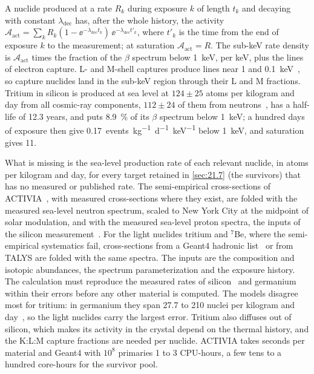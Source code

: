 A nuclide produced at a rate $R_k$ during exposure $k$ of length $t_k$ and decaying with constant $\lambda_{\mathrm{dec}}$ has, after the whole history, the activity $\mathcal{A}_{\mathrm{act}} = \sum_kR_k(1 - \ee^{-\lambda_{\mathrm{dec}}t_k})\,\ee^{-\lambda_{\mathrm{dec}}t'_k}$, where $t'_k$ is the time from the end of exposure $k$ to the measurement; at saturation $\mathcal{A}_{\mathrm{act}} = R$. The sub-keV rate density is $\mathcal{A}_{\mathrm{act}}$ times the fraction of the $\beta$ spectrum below \SI{1}{keV}, per keV, plus the lines of electron capture. L- and M-shell captures produce lines near 1 and \SI{0.1}{keV}~\cite[Sect.~1]{armengaud2017measurement}, so capture nuclides land in the sub-keV region through their L and M fractions. Tritium in silicon is produced at sea level at $124 \pm 25$ atoms per kilogram and day from all cosmic-ray components, $112 \pm 24$ of them from neutrons~\cite{saldanha2020cosmogenic}, has a half-life of 12.3 years, and puts \SI{8.9}{\percent} of its $\beta$ spectrum below \SI{1}{keV}; a hundred days of exposure then give \SI{0.17}{events.kg^{-1}.d^{-1}.keV^{-1}} below \SI{1}{keV}, and saturation gives 11.

What is missing is the sea-level production rate of each relevant nuclide, in atoms per kilogram and day, for every target retained in \cref{sec:21.7} (the survivors) that has no measured or published rate. The semi-empirical cross-sections of ACTIVIA~\cite{back2008activia}, with measured cross-sections where they exist, are folded with the measured sea-level neutron spectrum, scaled to New York City at the midpoint of solar modulation, and with the measured sea-level proton spectra, the inputs of the silicon measurement~\cite{saldanha2020cosmogenic}. For the light nuclides tritium and $^7$Be, where the semi-empirical systematics fail, cross-sections from a Geant4 hadronic list~\cite{agostinelli2003geant4} or from TALYS are folded with the same spectra. The inputs are the composition and isotopic abundances, the spectrum parameterization and the exposure history. The calculation must reproduce the measured rates of silicon~\cite{saldanha2020cosmogenic} and germanium~\cite{armengaud2017measurement} within their errors before any other material is computed. The models disagree most for tritium: in germanium they span 27.7 to 210 nuclei per kilogram and day~\cite[Sect.~6.3]{armengaud2017measurement}, so the light nuclides carry the largest error. Tritium also diffuses out of silicon, which makes its activity in the crystal depend on the thermal history, and the K:L:M capture fractions are needed per nuclide. ACTIVIA takes seconds per material and Geant4 with $10^8$ primaries 1 to 3 CPU-hours, a few tens to a hundred core-hours for the survivor pool.


